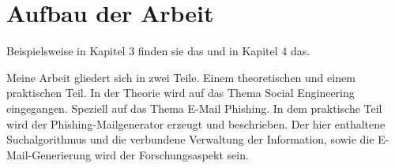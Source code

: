 \section{Aufbau der Arbeit}
\label {sec:Aufbau} 
Beispielsweise in Kapitel 3 finden sie das und in Kapitel 4 das.

Meine Arbeit gliedert sich in zwei Teile. Einem theoretischen und einem praktischen Teil. In der Theorie wird auf das Thema Social Engineering eingegangen. Speziell auf das Thema E-Mail Phishing. In dem praktische Teil wird der Phishing-Mailgenerator erzeugt und beschrieben. Der hier enthaltene Suchalgorithmus und die verbundene Verwaltung der Information, sowie die E-Mail-Generierung wird der Forschungsaspekt sein.





